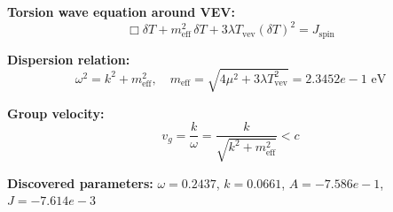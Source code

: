 
\textbf{Torsion wave equation around VEV:}
\begin{equation}
  \Box \delta T + m_{\text{eff}}^2 \, \delta T + 3\lambda T_{\text{vev}} (\delta T)^2 = J_{\text{spin}}
\end{equation}

\textbf{Dispersion relation:}
\begin{equation}
  \omega^2 = k^2 + m_{\text{eff}}^2, \quad
  m_{\text{eff}} = \sqrt{4\mu^2 + 3\lambda T_{\text{vev}}^2} = 2.3452e-1 \text{ eV}
\end{equation}

\textbf{Group velocity:}
\begin{equation}
  v_g = \frac{k}{\omega} = \frac{k}{\sqrt{k^2 + m_{\text{eff}}^2}} < c
\end{equation}

\textbf{Discovered parameters:}
$\omega = 0.2437$, \quad
$k = 0.0661$, \quad
$A = -7.586e-1$, \quad
$J = -7.614e-3$